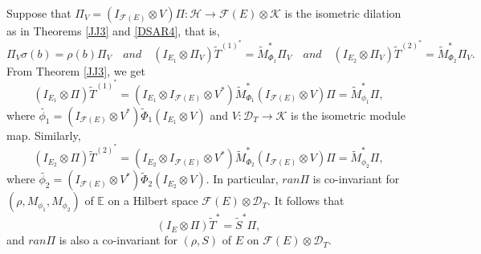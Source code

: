 \documentclass[12pt]{amsart}
\numberwithin{equation}{section}
\theoremstyle{plain}
\newcommand{\be}{\mathbb E}
\newcommand{\ot}{\otimes}
\newcommand{\wt}{\widetilde}
\newcommand{\wT}{\wt{T}}
\begin{document}
Suppose that $\Pi_V=(I_{\mathcal{F}(E)}\ot V)\Pi: \mathcal{H} \longrightarrow \mathcal{F}(E)\otimes\mathcal{K}$ is the isometric dilation as in Theorems \ref{JJ3} and \ref{DSAR4}, that is, $$ \Pi_V \sigma(b)=\rho(b)\Pi_V    \quad and \quad (I_{E_1}\ot \Pi_V)\wT^{(1)^*}=\widetilde{M}_{{\Phi}_1}^*\Pi_V \quad and \quad (I_{E_2}\ot \Pi_V)\wT^{(2)^*}=\widetilde{M}_{{\Phi}_2}^*\Pi_V.$$ From Theorem \ref{JJ3}, we get $$(I_{E_1}\ot \Pi)\wT^{(1)^*}=(I_{E_1}\ot I_{\mathcal{F}(E)}\ot V^*)\widetilde{M}^*_{{\Phi}_1}(I_{\mathcal{F}(E)}\ot V)\Pi=\widetilde{M}_{\phi_1}^*\Pi,$$ where $\widetilde{\phi_1}=(I_{\mathcal{F}(E)}\ot V^*)\widetilde{\Phi}_1(I_{E_1}\ot V)$ and $V:\mathcal{D}_{T}\to  \mathcal K$ is the isometric module map. Similarly, $$(I_{E_2}\ot \Pi)\wT^{(2)^*}=(I_{E_2}\ot I_{\mathcal{F}(E)}\ot V^*)\widetilde{M}^*_{{\Phi}_2}(I_{\mathcal{F}(E)}\ot V)\Pi=\widetilde{M}_{\phi_2}^*\Pi,$$ where $\widetilde{\phi_2}=(I_{\mathcal{F}(E)}\ot V^*)\widetilde{{\Phi}}_2(I_{E_2}\ot V)$. In particular, $ran \Pi$ is co-invariant for $(\rho,M_{\phi_1},M_{\phi_2})$ of $\be$ on a
Hilbert space $\mathcal{F}(E)\ot \mathcal{D}_{T}.$ It follows that 
$$(I_{E} \ot \Pi)\widetilde{T}^{*}=\widetilde{S}^{*}\Pi,$$ and $ran \Pi$ is also a co-invariant for $(\rho,S)$ of $E$ on $\mathcal{F}(E)\ot \mathcal{D}_{T}.$
\end{document}
